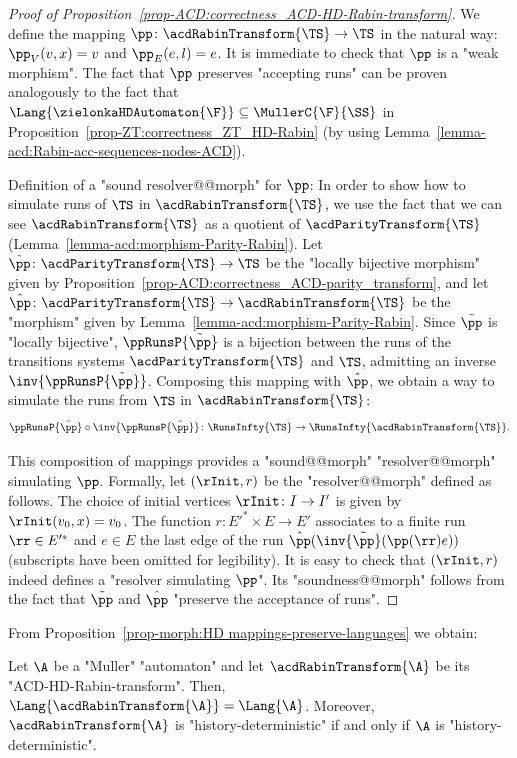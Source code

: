 \documentclass{theoretics}
\begin{document}
\begin{proof}[Proof of Proposition~\ref{prop-ACD:correctness_ACD-HD-Rabin-transform}]
	We define the mapping $\pp\colon \acdRabinTransform{\TS} \to \TS$ in the natural way: $\pp_V(v,x) = v$ and $\pp_E(e,l) = e$. It is immediate to check that $\pp$ is a "weak morphism". The fact that $\pp$ preserves "accepting runs" can be proven analogously to the fact that $\Lang{\zielonkaHDAutomaton{\F}} \subseteq \MullerC{\F}{\SS}$ in Proposition~\ref{prop-ZT:correctness_ZT_HD-Rabin} (by using Lemma~\ref{lemma-acd:Rabin-acc-sequences-nodes-ACD}).
	
	Definition of a "sound resolver@@morph" for $\pp$: In order to show how to simulate runs of $\TS$ in $\acdRabinTransform{\TS}$, we use the fact that we can see $\acdRabinTransform{\TS}$ as a quotient of $\acdParityTransform{\TS}$ (Lemma~\ref{lemma-acd:morphism-Parity-Rabin}). Let $\tilde{\pp}\colon \acdParityTransform{\TS} \to \TS$ be the "locally bijective morphism" given by Proposition~\ref{prop-ACD:correctness_ACD-parity_transform}, and let $\hat{\pp}\colon \acdParityTransform{\TS} \to \acdRabinTransform{\TS}$ be the "morphism" given by Lemma~\ref{lemma-acd:morphism-Parity-Rabin}.
	Since $\tilde{\pp}$ is "locally bijective", $\ppRunsP{\tilde{\pp}}$ is a bijection between the runs of the transitions systems $\acdParityTransform{\TS}$ and $\TS$, admitting an inverse $\inv{\ppRunsP{\tilde{\pp}}}$. Composing this mapping with $\hat{\pp}$, we obtain a way to simulate the runs from $\TS$ in $\acdRabinTransform{\TS}$:
	\[ \ppRunsP{\hat{\pp}} \circ \inv{\ppRunsP{\tilde{\pp}}} \colon \RunsInfty{\TS} \to \RunsInfty{\acdRabinTransform{\TS}}. \]
	
	This composition of mappings provides a "sound@@morph" "resolver@@morph" simulating $\pp$. Formally, let $(\rInit, r)$ be the "resolver@@morph" defined as follows. The choice of initial vertices $\rInit\colon I \to I'$ is given by $\rInit(v_0,x) = v_0$. The function $r\colon E'^* \times E \to E'$ associates to a finite run $\rr\in E'^*$ and $e\in E$ the last edge of the run $\hat{\pp}(\inv{\tilde{\pp}}(\pp(\rr)e))$ (subscripts have been omitted for legibility). It is easy to check that $(\rInit, r)$ indeed defines a "resolver simulating $\pp$". Its "soundness@@morph" follows from the fact that $\tilde{\pp}$ and $\hat{\pp}$ "preserve the acceptance of runs".
\end{proof}


From Proposition~\ref{prop-morph:HD mappings-preserve-languages} we obtain:

\begin{corollary}
	Let $\A$ be a "Muller" "automaton" and let $\acdRabinTransform{\A}$ be its "ACD-HD-Rabin-transform". Then, $\Lang{\acdRabinTransform{\A}} = \Lang{\A}$. Moreover, $\acdRabinTransform{\A}$  is "history-deterministic" if and only if $\A$ is "history-deterministic".
\end{corollary}
\end{document}
